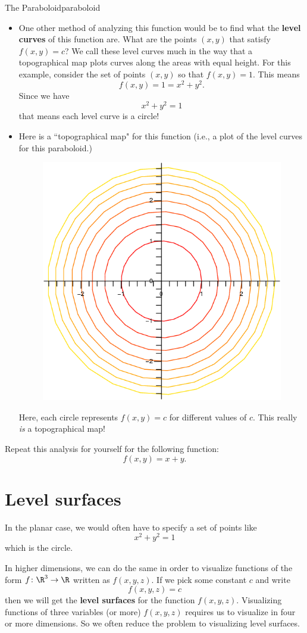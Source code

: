 \begin{ex}{The Paraboloid}{paraboloid}
\begin{itemize}
        \item One other method of analyzing this function would be to find what the \textbf{level curves} of this function are.  What are the points $(x,y)$ that satisfy $f(x,y)=c$?  We call these level curves much in the way that a topographical map plots curves along the areas with equal height.  For this example, consider the set of points $(x,y)$ so that $f(x,y)=1.$ This means
        \[
        f(x,y)=1=x^2+y^2.
        \]
        Since we have
        \[
        x^2+y^2=1
        \]
        that means each level curve is a circle!
        \item Here is a ``topographical map" for this function (i.e., a plot of the level curves for this paraboloid.)
        \begin{figure}[H]
            \centering
            \includegraphics[width=.4\textwidth]{Figures/parabolic_level_curves.png}
        \end{figure}
        Here, each circle represents $f(x,y)=c$ for different values of $c$.  This really \emph{is} a topographical map!
        \end{itemize}
        \end{ex}
        
        \begin{exercise}[Plane]
        Repeat this analysis for yourself for the following function:
        \[
        f(x,y)=x+y.
        \]
        \end{exercise}
        
        \section{Level surfaces}
        In the planar case, we would often have to specify a set of points like
        \[
        x^2+y^2=1
        \]
        which is the circle.  
        
        In higher dimensions, we can do the same in order to visualize functions of the form $f\colon \R^3\to \R$ written as $f(x,y,z)$.  If we pick some constant $c$ and write
        \[
        f(x,y,z)=c
        \]
        then we will get the \textbf{level surfaces} for the function $f(x,y,z)$.  Visualizing functions of three variables (or more) $f(x,y,z)$ requires us to visualize in four or more dimensions. So we often reduce the problem to visualizing level surfaces.
        
